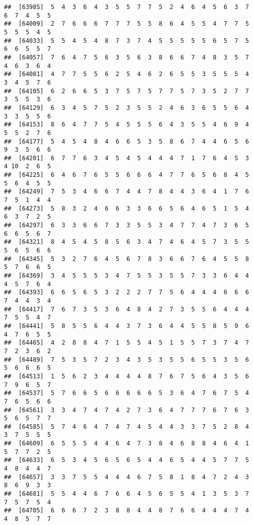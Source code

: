 \documentclass[
]{book}
\begin{document}
\begin{verbatim}
##  [63985]  5  4  3  6  4  3  5  5  7  7  5  2  4  6  4  5  6  3  7  6  7  4  5  5
##  [64009]  2  7  6  6  6  7  7  7  5  5  8  6  4  5  5  4  7  7  5  5  5  5  4  5
##  [64033]  5  5  4  5  4  8  7  3  7  4  5  5  5  5  5  6  5  7  5  6  6  5  5  7
##  [64057]  7  6  4  7  5  6  3  5  6  3  8  6  6  7  4  8  3  5  7  4  6  3  6  4
##  [64081]  4  7  7  5  5  6  2  5  4  6  2  6  5  5  3  5  5  5  4  3  4  5  7  6
##  [64105]  6  2  6  6  5  3  7  5  7  5  7  7  5  7  3  5  2  7  7  3  5  5  3  6
##  [64129]  6  3  4  5  7  5  2  3  5  5  2  4  6  3  6  5  5  6  4  3  3  5  5  6
##  [64153]  8  6  4  7  7  5  4  5  5  5  6  4  3  5  5  4  6  9  4  5  5  2  7  6
##  [64177]  5  4  5  4  8  4  6  6  5  3  5  8  6  7  4  4  6  5  6  9  3  5  6  6
##  [64201]  6  7  7  6  3  4  5  4  5  4  4  4  7  1  7  6  4  5  3  4 10  2  6  5
##  [64225]  6  4  6  7  6  5  5  6  6  6  4  7  7  6  5  6  8  4  5  5  6  4  5  5
##  [64249]  7  5  3  4  6  6  7  4  4  7  8  4  4  3  6  4  1  7  6  7  5  1  4  4
##  [64273]  5  8  3  2  4  6  6  3  3  6  6  5  6  4  6  5  1  5  4  6  3  7  2  5
##  [64297]  6  3  3  6  6  7  3  3  5  5  3  4  7  7  4  7  3  6  5  6  6  5  6  7
##  [64321]  8  4  5  4  5  8  5  6  3  4  7  4  6  4  5  7  3  5  5  5  6  5  6  6
##  [64345]  5  3  2  7  6  4  5  6  7  8  3  6  6  7  6  4  5  5  8  5  7  6  6  5
##  [64369]  3  4  5  5  5  3  4  7  5  5  3  5  5  7  3  3  6  4  4  4  5  7  6  4
##  [64393]  6  6  5  6  5  3  2  2  2  7  7  5  6  4  4  4  6  6  6  7  4  4  3  4
##  [64417]  7  6  7  3  5  3  6  4  8  4  2  7  3  5  5  6  4  4  4  7  5  5  4  7
##  [64441]  5  8  5  5  6  4  4  3  7  3  6  4  4  5  5  8  5  9  6  4  7  6  5  5
##  [64465]  4  2  8  8  4  7  1  5  5  4  5  1  5  5  7  3  7  4  7  7  2  3  6  2
##  [64489]  7  5  3  5  7  2  3  4  3  5  3  5  5  6  5  5  3  5  6  5  6  6  6  5
##  [64513]  1  5  6  2  3  4  4  4  4  8  7  6  7  5  6  4  3  5  6  7  9  6  5  7
##  [64537]  5  7  6  6  5  6  6  6  6  6  5  3  6  4  7  6  7  5  4  7  6  5  6  6
##  [64561]  3  3  4  7  4  7  4  2  7  3  6  4  7  7  7  6  7  6  3  5  6  5  7  7
##  [64585]  5  7  4  6  4  7  4  7  4  5  4  4  3  3  7  5  2  8  4  3  7  5  5  5
##  [64609]  6  5  5  5  4  4  6  4  7  3  8  4  6  8  8  4  6  4  1  5  7  7  2  5
##  [64633]  6  5  3  4  5  6  5  6  5  4  4  6  5  4  4  5  7  7  5  4  8  4  4  7
##  [64657]  3  3  7  5  5  4  4  4  6  7  5  8  1  8  4  7  2  4  3  8  6  9  3  3
##  [64681]  5  5  4  4  6  7  6  6  4  5  6  5  5  4  1  3  5  3  7  7  5  7  5  4
##  [64705]  6  6  6  7  2  3  8  8  4  4  8  7  6  6  4  4  4  7  4  4  8  5  7  7

\end{verbatim}
\end{document}
